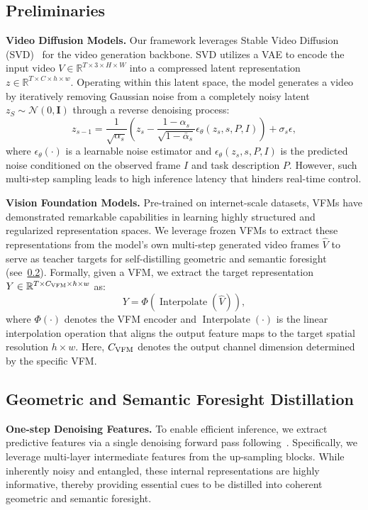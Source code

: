 \documentclass[runningheads]{llncs}
\begin{document}
\subsection{Preliminaries}
\label{sec:preliminaries}

\noindent \textbf{Video Diffusion Models.}
Our framework leverages Stable Video Diffusion (SVD)~\cite{blattmann2023stable} for the video generation backbone. SVD utilizes a VAE to encode the input video $V \in \mathbb{R}^{T \times 3 \times H \times W}$ into a compressed latent representation $z \in \mathbb{R}^{T \times C \times h \times w}$. Operating within this latent space, the model generates a video by iteratively removing Gaussian noise from a completely noisy latent $z_S \sim \mathcal{N}(0, \mathbf{I})$ through a reverse denoising process:
\begin{equation}
    z_{s-1} = \frac{1}{\sqrt{\alpha_s}} \left( z_s - \frac{1-\alpha_s}{\sqrt{1-\bar{\alpha}_s}} \epsilon_\theta(z_s, s, P,I) \right) + \sigma_s\epsilon,
\end{equation}
where $\epsilon_\theta(\cdot)$ is a learnable noise estimator and $\epsilon_\theta(z_s, s, P, I)$ is the predicted noise conditioned on the observed frame $I$ and task description $P$. However, such multi-step sampling leads to high inference latency that hinders real-time control.


\noindent \textbf{Vision Foundation Models.}
Pre-trained on internet-scale datasets, VFMs have demonstrated remarkable capabilities in learning highly structured and regularized representation spaces. We leverage frozen VFMs to extract these representations from the model's own multi-step generated video frames $\hat{V}$ to serve as teacher targets for self-distilling geometric and semantic foresight (see~\cref{sec:distill}). 
Formally, given a VFM, we extract the target representation $Y \in \mathbb{R}^{T\times C_\textnormal{VFM} \times h \times w}$ as:
\begin{equation}
    Y = \Phi(\operatorname{Interpolate}(\hat{V})),
\label{eq:vfm}
\end{equation}
where $\Phi(\cdot)$ denotes the VFM encoder and $\operatorname{Interpolate}(\cdot)$ is the linear interpolation operation that aligns the output feature maps to the target spatial resolution $h \times w$. Here, $C_\textnormal{VFM}$ denotes the output channel dimension determined by the specific VFM. 

\subsection{Geometric and Semantic Foresight Distillation}
\label{sec:distill}
\noindent \textbf{One-step Denoising Features.}
To enable efficient inference, we extract predictive features via a single denoising forward pass following~\cite{huvideo}. Specifically, we leverage multi-layer intermediate features from the up-sampling blocks. While inherently noisy and entangled, these internal representations are highly informative, thereby providing essential cues to be distilled into coherent geometric and semantic foresight.
\end{document}
